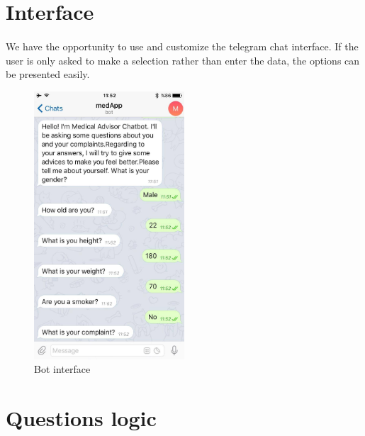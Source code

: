 \section{Interface}

\paragraph{}
We	have	the	opportunity	to	use	and	customize	the	telegram	chat	interface.	If	the	user	is	only	asked	to	make	a	selection	rather	than	enter	the	data,	the	options	can	be	presented	easily.	

\begin{figure}[H]
	\centering
	\includegraphics[height=10cm]{screenshot}
	\caption{Bot interface}
	\label{screen}
\end{figure}

\section{Questions logic}

